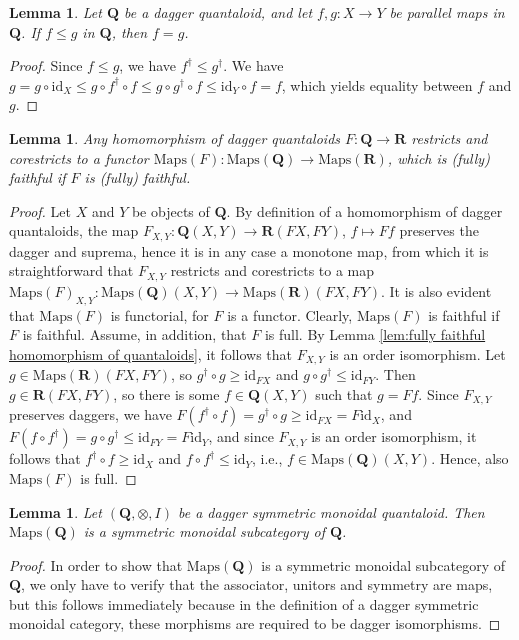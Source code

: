 \documentclass[12pt]{tac}
\newtheorem{lemma}[theorem]{Lemma}
\theoremstyle{definition}
\theoremstyle{remark}
\newcommand{\<}{\langle}
\renewcommand{\>}{\rangle}
\renewcommand{\:}{\colon}
\newcommand{\id}{\mathrm{id}}
\begin{document}
\begin{lemma}\label{lem:order between maps is trivial}
    Let $\mathbf Q$ be a dagger quantaloid, and let $f,g:X\to Y$ be parallel maps in $\mathbf Q$. If $f\leq g$ in $\mathbf Q$, then $f=g$.
\end{lemma}
\begin{proof}
Since $f\leq g$, we have $f^\dag\leq g^\dag$.
    We have $g=g\circ \id_X\leq g\circ f^\dag\circ f\leq g\circ g^\dag\circ f\leq\id_Y\circ f=f$, which yields equality between $f$ and $g$.
\end{proof}



\begin{lemma}\label{lem:Maps_functor}
    Any homomorphism of dagger quantaloids $F:\mathbf Q\to \mathbf R$ restricts and corestricts to a functor $\mathrm{Maps}(F):\mathrm{Maps}(\mathbf Q)\to\mathrm{Maps}(\mathbf R)$, which is (fully) faithful if $F$ is (fully) faithful.
\end{lemma}
\begin{proof}
Let $X$ and $Y$ be objects of $\mathbf Q$. By definition of a homomorphism of dagger quantaloids, the map $F_{X,Y}:\mathbf{Q}(X,Y)\to\mathbf R(FX,FY)$, $f\mapsto Ff$ preserves the dagger and suprema, hence it is in any case a monotone map, from which it is straightforward that $F_{X,Y}$ restricts and corestricts to a map $\mathrm{Maps}(F)_{X,Y}:\mathrm{Maps}(\mathbf Q)(X,Y)\to \mathrm{Maps}(\mathbf R)(FX,FY)$. It is also evident that $\mathrm{Maps}(F)$ is functorial, for $F$ is a functor. Clearly, $\mathrm{Maps}(F)$ is faithful if $F$ is faithful. Assume, in addition, that $F$ is full. By Lemma \ref{lem:fully faithful homomorphism of quantaloids}, it follows that $F_{X,Y}$ is an order isomorphism. Let $g\in\mathrm{Maps}(\mathbf R)(FX,FY)$, so $g^\dag\circ g\geq \id_{FX}$ and $g\circ g^\dag\leq \id_{FY}$. Then $g\in \mathbf R(FX,FY)$, so there is some $f\in\mathbf Q(X,Y)$ such that $g=Ff$. Since $F_{X,Y}$ preserves daggers, we have $F(f^\dag\circ f)=g^\dag\circ g\geq\id_{FX}=F\id_{X}$, and $F(f\circ f^\dag)=g\circ g^\dag\leq \id_{FY}=F\id_Y$, and since $F_{X,Y}$ is an order isomorphism, it follows that $f^\dag\circ f\geq\id_X$ and $f\circ f^\dag\leq\id_Y$, i.e., $f\in\mathrm{Maps}(\mathbf Q)(X,Y)$. Hence, also $\mathrm{Maps}(F)$ is full. 
\end{proof}

\begin{lemma}\label{lem:Maps form monoidal subcategory}
    Let $(\mathbf Q,\otimes,I)$ be a dagger symmetric monoidal quantaloid. Then $\mathrm{Maps}(\mathbf Q)$ is a symmetric monoidal subcategory of $\mathbf Q$.
\end{lemma}
\begin{proof}
In order to show that $\mathrm{Maps}(\mathbf Q)$ is a symmetric monoidal subcategory of $\mathbf Q$, we only have to verify that the associator, unitors and symmetry are maps, but this follows immediately because in the definition of a dagger symmetric monoidal category, these morphisms are required to be dagger isomorphisms.
\end{proof}
\end{document}

